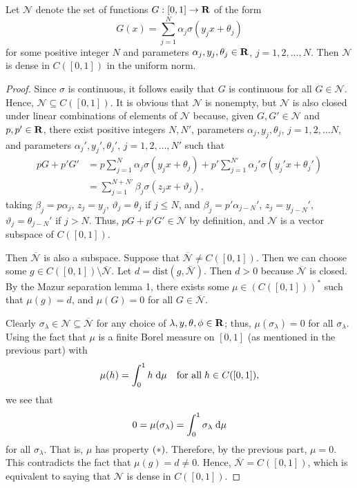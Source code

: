 \documentclass{homework}
\begin{document}
\begin{arabicparts}
		\newcommand{\nn}{\mathcal{N}}
		\questionpart 
		Let $\nn$ denote the set of functions $G: [0,1] \to \textbf{R}$ of the form
		\begin{equation}
			G(x) = \sum_{j=1}^N \alpha_j \sigma(y_jx + \theta_j)
		\end{equation}
		for some positive integer $N$ and parameters $\alpha_j, y_j, \theta_j \in \textbf{R}$, $j=1,2,\dots,N$. Then $\nn$ is dense in $C([0,1])$ in the uniform norm.
		\begin{proof}
			Since $\sigma$ is continuous, it follows easily that $G$ is continuous for all $G \in \nn$. Hence, $\nn \subseteq C([0,1])$. It is obvious that $\nn$ is nonempty, but $\nn$ is also closed under linear combinations of elements of $\nn$ because, given $G,G'\in\nn$ and $p,p' \in \textbf{R}$, there exist positive integers $N, N'$, parameters $\alpha_j, y_j, \theta_j$, $j=1,2,\dots N$, and parameters $\alpha_j', y_j', \theta_j'$, $j=1,2,\dots,N'$ such that
			\begin{align}
				pG + p'G' &= p\sum_{j=1}^N \alpha_j\sigma(y_jx + \theta_j) + p'\sum_{j=1}^{N'}\alpha_j'\sigma(y_j'x + \theta_j') \\
				&= \sum_{j=1}^{N+N'}\beta_j\sigma(z_jx+\vartheta_j),
			\end{align}
			taking $\beta_j = p\alpha_j$, $z_j = y_j$, $\vartheta_j = \theta_j$ if $j \le N$, and $\beta_j = p'\alpha_{j-N}'$, $z_j = y_{j-N}'$, $\vartheta_j = \theta_{j-N}'$ if $j > N$. Thus, $pG + p'G' \in \nn$ by definition, and $\nn$ is a vector subspace of $C([0,1])$.
			
			Then $\overline{\nn}$ is also a subspace. Suppose that $\overline{\nn} \ne C([0,1])$. Then we can choose some $g \in C([0,1]) \setminus \overline{\nn}$. Let $d = \mathrm{dist}(g, \overline{\nn})$. Then $d > 0$ because $\overline{\nn}$ is closed. By the Mazur separation lemma 1, there exists some $\mu \in (C([0,1]))^*$ such that $\mu(g) = d$, and $\mu(G) = 0$ for all $G \in \overline{\nn}$.
			
			Clearly $\sigma_\lambda \in \nn \subseteq \overline{\nn}$ for any choice of $\lambda, y, \theta, \phi \in \textbf{R}$; thus, $\mu(\sigma_\lambda) = 0$ for all $\sigma_\lambda$. Using the fact that $\mu$ is a finite Borel measure on $[0,1]$ (as mentioned in the previous part) with
			\begin{equation}
				\mu(h) = \int_0^1h\;\text{d} \mu \quad \text{for all}\; h\in C([0,1]),
			\end{equation}
			we see that
			\begin{equation}
				0 = \mu(\sigma_\lambda) = \int_0^1\sigma_\lambda\;\text{d}\mu
			\end{equation}
			for all $\sigma_\lambda$. That is, $\mu$ has property $(*)$. Therefore, by the previous part, $\mu = 0$. This contradicts the fact that $\mu(g) = d \ne 0$. Hence, $\overline{\nn} = C([0,1])$, which is equivalent to saying that $\nn$ is dense in $C([0,1])$.
		\end{proof}
	\end{arabicparts}
	
\end{document}
